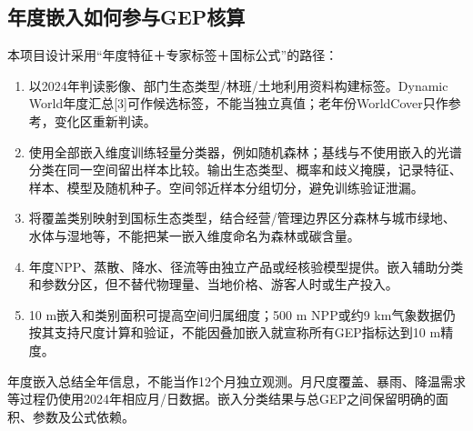 \documentclass[12pt,a4paper,fontset=fandol]{ctexart}
\begin{document}
\subsection{年度嵌入如何参与GEP核算}
本项目设计采用“年度特征＋专家标签＋国标公式”的路径：
\begin{enumerate}
\item 以2024年判读影像、部门生态类型/林班/土地利用资料构建标签。Dynamic World年度汇总[3]可作候选标签，不能当独立真值；老年份WorldCover只作参考，变化区重新判读。
\item 使用全部嵌入维度训练轻量分类器，例如随机森林；基线与不使用嵌入的光谱分类在同一空间留出样本比较。输出生态类型、概率和歧义掩膜，记录特征、样本、模型及随机种子。空间邻近样本分组切分，避免训练验证泄漏。
\item 将覆盖类别映射到国标生态类型，结合经营/管理边界区分森林与城市绿地、水体与湿地等，不能把某一嵌入维度命名为森林或碳含量。
\item 年度NPP、蒸散、降水、径流等由独立产品或经核验模型提供。嵌入辅助分类和参数分区，但不替代物理量、当地价格、游客人时或生产投入。
\item 10 m嵌入和类别面积可提高空间归属细度；500 m NPP或约9 km气象数据仍按其支持尺度计算和验证，不能因叠加嵌入就宣称所有GEP指标达到10 m精度。
\end{enumerate}
年度嵌入总结全年信息，不能当作12个月独立观测。月尺度覆盖、暴雨、降温需求等过程仍使用2024年相应月/日数据。嵌入分类结果与总GEP之间保留明确的面积、参数及公式依赖。
\end{document}
